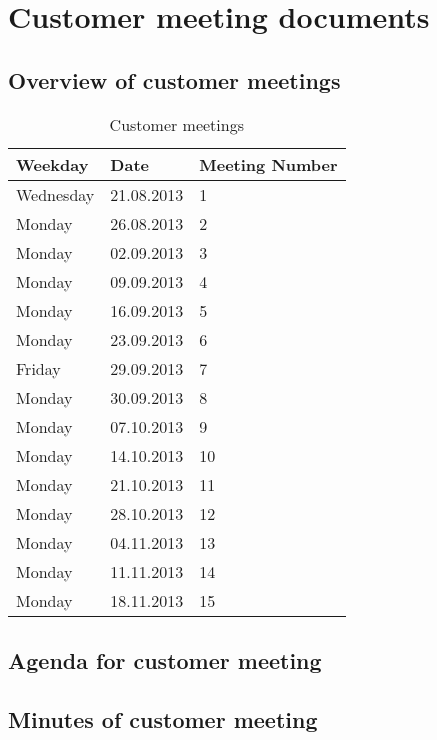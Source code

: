 \chapter{Customer meeting documents}
\label{AppendixE}

\iffalse



\begin{center}
\texttt{[image: ../Customer\_meetings/3.pdf]}
\end{center}
\fi

\section{Overview of customer meetings}

\begin{table}[h]
\begin{center}
\begin{tabular}{ l | l | l }
  \hline
  Weekday & Date & Meeting Number \\
  \hline\noalign{\smallskip}\noalign{\smallskip}\hline
  	Wednesday 	&	21.08.2013 & 1 \\
	Monday		&	26.08.2013 & 2 \\
	Monday		& 	02.09.2013 & 3 \\
	Monday 		&	09.09.2013 & 4 \\
	Monday 		&	16.09.2013 & 5 \\
	Monday 		&	23.09.2013 & 6 \\
	Friday 		&	29.09.2013 & 7 \\
	Monday 		&	30.09.2013 & 8 \\
	Monday 		&	07.10.2013 & 9 \\
	Monday 		&	14.10.2013 & 10 \\
	Monday 		&	21.10.2013 & 11 \\
	Monday 		&	28.10.2013 & 12 \\
	Monday 		&	04.11.2013 & 13 \\
	Monday 		&	11.11.2013 & 14 \\
	Monday 		&	18.11.2013 & 15 \\
  \hline
\end{tabular}
\end{center}
\caption{Customer meetings}
\label{table:customermeetings}
\end{table}

\section{Agenda for customer meeting}

\section{Minutes of customer meeting}
